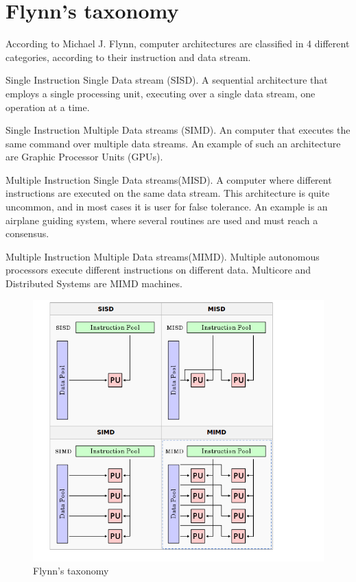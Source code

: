 \section{Flynn's taxonomy}
According to Michael J. Flynn, computer architectures are classified in 4 different categories, according to their instruction and data stream. 


Single Instruction Single Data stream (SISD). 
	A sequential architecture that employs a single processing unit, executing over a single data stream, one operation at a time. 

Single Instruction Multiple Data streams (SIMD).
	An computer  that executes the same command over multiple data streams. An example of such an architecture are Graphic Processor Units (GPUs).

Multiple Instruction Single Data streams(MISD).
	A computer where different instructions are executed on the same data stream. This architecture is quite uncommon, and in most cases it is user for false tolerance. An example is an airplane guiding system, where several routines are used and must reach a consensus.

Multiple Instruction Multiple Data streams(MIMD).
	Multiple autonomous processors execute different instructions on different data. Multicore and Distributed Systems are MIMD machines.


\begin{figure}
 \centering
  \includegraphics[scale=0.4]{flynsTaxonomy.png}
\caption{Flynn's taxonomy}
\label{Flynn's taxonomy}
\end{figure}

